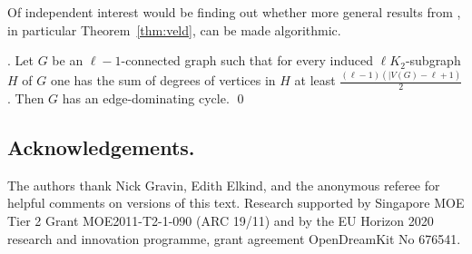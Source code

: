 \documentclass[runningheads,a4paper]{llncs}
\begin{document}
Of independent interest would be finding out whether more general results from \cite{veldman83},
in particular Theorem~\ref{thm:veld}, can be made algorithmic.
\begin{theorem}\label{thm:veld}
{\rm \cite[Theorem~3]{veldman83}.} Let $G$ be an $\ell-1$-connected graph such that
for every induced $\ell K_2$-subgraph $H$ of $G$ one has the
sum of degrees of vertices in $H$ at least $\frac{(\ell-1)(|V(G)-\ell +1)}{2}$.
Then $G$ has  an edge-dominating cycle. \qed
\end{theorem}

\subsection*{Acknowledgements.}
The authors thank Nick Gravin, Edith Elkind, and the anonymous referee
for helpful comments on versions of this text.
Research supported by Singapore MOE Tier 2 Grant MOE2011-T2-1-090 (ARC 19/11)
and by the EU Horizon 2020 research and innovation programme, grant agreement
OpenDreamKit No 676541.



%
\end{document}
